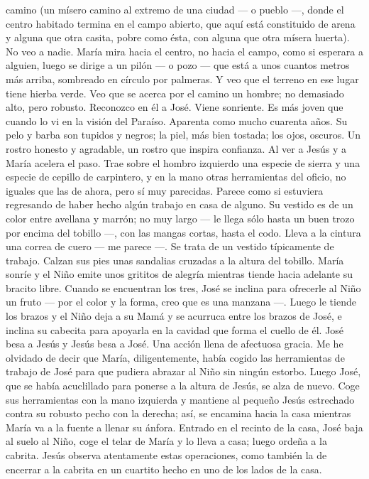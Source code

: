 \documentclass[12pt]{book} %
\begin{document}
camino (un mísero camino al extremo de una ciudad — o pueblo —, donde el centro habitado termina en el campo abierto, que aquí está constituido de arena y alguna que otra casita, pobre como ésta, con alguna que otra mísera huerta). 
No veo a nadie. María mira hacia el centro, no hacia el campo, como si esperara a alguien, luego se dirige a un pilón — 
o pozo — que está a unos cuantos metros más arriba, sombreado en círculo por palmeras. Y veo que el terreno en ese lugar tiene hierba verde. 
Veo que se acerca por el camino un hombre; no demasiado alto, pero robusto. Reconozco en él a José. Viene sonriente. Es más joven que cuando lo vi en la visión del Paraíso. Aparenta como mucho cuarenta años. Su pelo y barba son tupidos y negros; la piel, más bien tostada; los ojos, oscuros. Un rostro honesto y agradable, un rostro que inspira confianza. 
Al ver a Jesús y a María acelera el paso. Trae sobre el hombro izquierdo una especie de sierra y una especie de cepillo 
de carpintero, y en la mano otras herramientas del oficio, no iguales que las de ahora, pero sí muy parecidas. Parece como si estuviera regresando de haber hecho algún trabajo en casa de alguno. Su vestido es de un color entre avellana y marrón; no muy largo — le llega sólo hasta un buen trozo por encima del tobillo —, con las mangas cortas, hasta el codo. Lleva a la cintura una correa de cuero — me parece —. Se trata de un vestido típicamente de trabajo. Calzan sus pies unas sandalias cruzadas a la altura del tobillo. 
María sonríe y el Niño emite unos grititos de alegría mientras tiende hacia adelante su bracito libre. Cuando se 
encuentran los tres, José se inclina para ofrecerle al Niño un fruto — por el color y la forma, creo que es una manzana —. Luego le tiende los brazos y el Niño deja a su Mamá y se acurruca entre los brazos de José, e inclina su cabecita para apoyarla en la cavidad que forma el cuello de él. José besa a Jesús y Jesús besa a José. Una acción llena de afectuosa gracia. 
Me he olvidado de decir que María, diligentemente, había cogido las herramientas de trabajo de José para que pudiera 
abrazar al Niño sin ningún estorbo. 
Luego José, que se había acuclillado para ponerse a la altura de Jesús, se alza de nuevo. Coge sus herramientas con la 
mano izquierda y mantiene al pequeño Jesús estrechado contra su robusto pecho con la derecha; así, se encamina hacia la casa mientras María va a la fuente a llenar su ánfora. 
Entrado en el recinto de la casa, José baja al suelo al Niño, coge el telar de María y lo lleva a casa; luego ordeña a la 
cabrita. Jesús observa atentamente estas operaciones, como también la de encerrar a la cabrita en un cuartito hecho en uno de los lados de la casa. 
\end{document}

